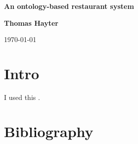 \documentclass{article}
\begin{document}
\begin{titlepage}
\begin{center}
\vspace*{5cm}

\Huge
\textbf{An ontology-based restaurant system}

\vspace{1cm}

\Large
\textbf{Thomas Hayter}

\vspace{1cm}

\today
\end{center}
\end{titlepage}

\tableofcontents

\section{Intro}
I used this \cite{pizza_tutorial_pdf}.
\section{Bibliography}


\end{document}
